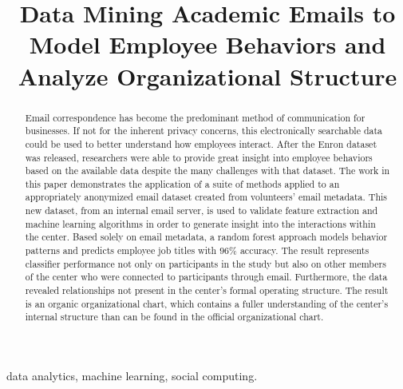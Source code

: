 \documentclass[10pt,twocolumn,conference]{IEEEtran}
\begin{document}
    
\title{Data Mining Academic Emails to Model Employee Behaviors and Analyze Organizational Structure}
\author{
} 
\maketitle

\begin{abstract}
Email correspondence has become the predominant method of communication for businesses.
If not for the inherent privacy concerns, this electronically searchable data could be used to better understand how employees interact.
After the Enron dataset was released, researchers were able to provide great insight into employee behaviors based on the available data despite the many challenges with that dataset.
The work in this paper demonstrates the application of a suite of methods applied to an appropriately anonymized email dataset created from volunteers' email metadata.
This new dataset, from an internal email server, is used to validate feature extraction and machine learning algorithms in order to generate insight into the interactions within the center.
Based solely on email metadata, a random forest approach models behavior patterns and predicts employee job titles with $96\%$ accuracy.
The result represents classifier performance not only on participants in the study but also on other members of the center who were connected to participants through email.
Furthermore, the data revealed relationships not present in the center's formal operating structure.
The result is an organic organizational chart, which contains a fuller understanding of the center's internal structure than can be found in the official organizational chart.
\end{abstract}

	\begin{IEEEkeywords}
		data analytics, machine learning, social computing.
	\end{IEEEkeywords}
\end{document}
